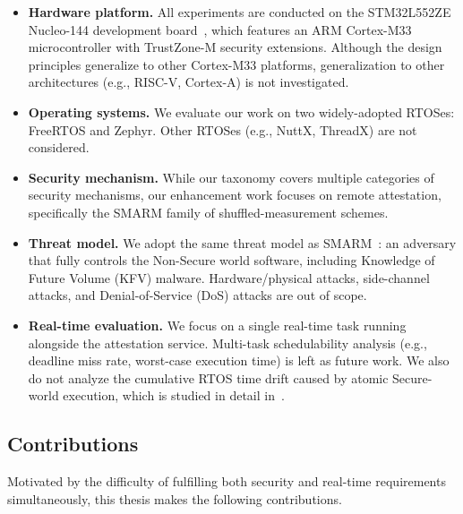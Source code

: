 \documentclass[a4paper,10pt]{article}
\begin{document}
\begin{itemize}
    \item \textbf{Hardware platform.} All experiments are conducted on
    the STM32L552ZE Nucleo-144 development board~\cite{stm32l552},
    which features an ARM Cortex-M33 microcontroller with TrustZone-M
    security extensions. Although the design principles generalize to
    other Cortex-M33 platforms, generalization to other architectures
    (e.g., RISC-V, Cortex-A) is not investigated.
    
    \item \textbf{Operating systems.} We evaluate our work on two
    widely-adopted RTOSes: FreeRTOS and Zephyr. Other RTOSes (e.g.,
    NuttX, ThreadX) are not considered.
    
    \item \textbf{Security mechanism.} While our taxonomy covers
    multiple categories of security mechanisms, our enhancement work
    focuses on remote attestation, specifically the SMARM family of
    shuffled-measurement schemes.
    
    \item \textbf{Threat model.} We adopt the same threat model as
    SMARM~\cite{carpent2018smarm}: an adversary that fully controls
    the Non-Secure world software, including Knowledge of Future Volume
    (KFV) malware. Hardware/physical attacks, side-channel attacks,
    and Denial-of-Service (DoS) attacks are out of scope.
    
    \item \textbf{Real-time evaluation.} We focus on a single real-time
    task running alongside the attestation service. Multi-task
    schedulability analysis (e.g., deadline miss rate, worst-case
    execution time) is left as future work. We also do not analyze
    the cumulative RTOS time drift caused by atomic Secure-world
    execution, which is studied in detail in~\cite{joianeto2026iccad}.
\end{itemize}


\subsection{Contributions}

Motivated by the difficulty of fulfilling both security and real-time
requirements simultaneously, this thesis makes the following
contributions.
\end{document}
